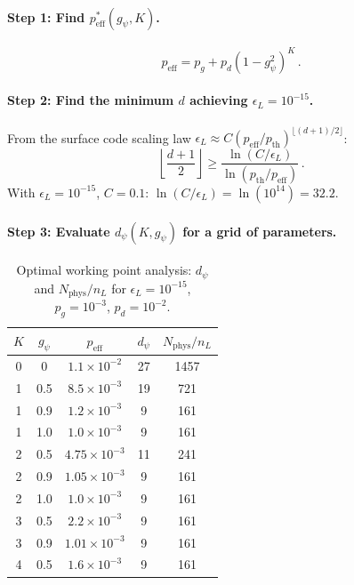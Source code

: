 \documentclass[11pt]{article}
\theoremstyle{definition}
\theoremstyle{remark}
\begin{document}
\paragraph{Step 1: Find $p_{\mathrm{eff}}^*(g_\psi, K)$.}
\begin{equation}
p_{\mathrm{eff}} = p_g + p_d(1-g_\psi^2)^K\,.
\end{equation}

\paragraph{Step 2: Find the minimum $d$ achieving $\epsilon_L = 10^{-15}$.}

From the surface code scaling law $\epsilon_L \approx C(p_{\mathrm{eff}}/
p_{\mathrm{th}})^{\lfloor (d+1)/2\rfloor}$:
\begin{equation}
\left\lfloor\frac{d+1}{2}\right\rfloor \geq
\frac{\ln(C/\epsilon_L)}{\ln(p_{\mathrm{th}}/p_{\mathrm{eff}})}\,.
\end{equation}
With $\epsilon_L = 10^{-15}$, $C = 0.1$: $\ln(C/\epsilon_L) = \ln(10^{14}) = 32.2$.

\paragraph{Step 3: Evaluate $d_\psi(K, g_\psi)$ for a grid of parameters.}

\begin{table}[h!]
\centering
\caption{Optimal working point analysis: $d_\psi$ and $N_{\mathrm{phys}}/n_L$
for $\epsilon_L = 10^{-15}$, $p_g = 10^{-3}$, $p_d = 10^{-2}$.}
\label{tab:optimal-qec}
\begin{tabular}{@{}ccccc@{}}
\toprule
$K$ & $g_\psi$ & $p_{\mathrm{eff}}$ & $d_\psi$ & $N_{\mathrm{phys}}/n_L$ \\
\midrule
0 & 0 & $1.1\times 10^{-2}$ & 27 & 1457 \\
1 & 0.5 & $8.5\times 10^{-3}$ & 19 & 721 \\
1 & 0.9 & $1.2\times 10^{-3}$ & 9 & 161 \\
1 & 1.0 & $1.0\times 10^{-3}$ & 9 & 161 \\
2 & 0.5 & $4.75\times 10^{-3}$ & 11 & 241 \\
2 & 0.9 & $1.05\times 10^{-3}$ & 9 & 161 \\
2 & 1.0 & $1.0\times 10^{-3}$ & 9 & 161 \\
3 & 0.5 & $2.2\times 10^{-3}$ & 9 & 161 \\
3 & 0.9 & $1.01\times 10^{-3}$ & 9 & 161 \\
4 & 0.5 & $1.6\times 10^{-3}$ & 9 & 161 \\
\bottomrule
\end{tabular}
\end{table}
\end{document}
